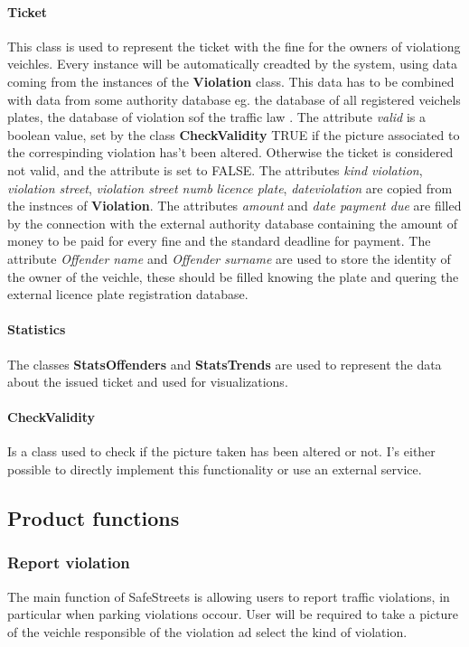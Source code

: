 \paragraph{Ticket}
This class is used to represent the ticket with the fine for the owners of violationg veichles. Every instance will be automatically creadted by the system, using data coming from the instances of the \textbf{Violation} class. This data has to be combined with data from some authority database eg. the database of all registered veichels plates, the database of violation sof the traffic law .
The attribute \textit{valid} is a boolean value, set by the class \textbf{CheckValidity} TRUE if the picture associated to the correspinding violation has't been altered. Otherwise the ticket is considered not valid, and the attribute is set to FALSE.
The attributes \textit{kind violation}, \textit{violation street}, \textit{violation street numb} \textit{licence plate}, \textit{dateviolation} are copied from the instnces of \textbf{Violation}.
The attributes \textit{amount} and \textit{date payment due} are filled by the connection with the external authority database containing the amount of money to be paid for every fine and the standard deadline for payment.
The attribute \textit{Offender name} and \textit{Offender surname} are used to store the identity of the owner of the veichle, these should be filled knowing the plate and quering the external licence plate registration database.

\paragraph{Statistics}
The classes \textbf{StatsOffenders} and \textbf{StatsTrends} are used to represent the data about the issued ticket and used for visualizations.

\paragraph{CheckValidity}
Is a class used to check if the picture taken has been altered or not. I's either possible to directly implement this functionality or use an external service.


\subsection{Product functions}

\subsubsection{Report violation}
The main function of SafeStreets is allowing users to report traffic violations, in particular when parking violations occour.
User will be required to take a picture of the veichle responsible of the violation ad select the kind of violation.

